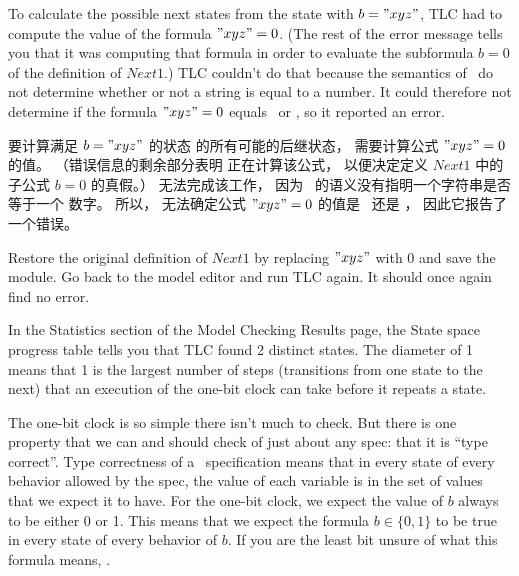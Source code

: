 \begin{en}
To calculate the possible next states from the state with $b="xyz"$,
TLC had to compute the value of the formula $"xyz"=0$.  (The rest of
the error message tells you that it was computing that formula in
order to evaluate the subformula $b=0$ of the definition of $Next1$.)
TLC couldn't do that because the semantics of \tlaplus\ do not
determine whether or not a string is equal to a 
number.  It could
therefore not determine if the formula $"xyz"=0$ equals \TRUE\ or
\FALSE, so it reported an error. 
\end{en}

\begin{ch}
  要计算满足 $b="xyz"$ 的状态  的所有可能的后继状态，
  \tlc{} 需要计算公式 $"xyz"=0$ 的值。
  （错误信息的剩余部分表明 \tlc{} 正在计算该公式，
  以便决定定义 $Next1$ 中的子公式 $b=0$ 的真假。）
  \tlc{} 无法完成该工作，
  因为 \tlaplus\ 的语义没有指明一个字符串是否等于一个
  数字。
  所以，\tlc{} 无法确定公式 $"xyz"=0$ 的值是 \TRUE\ 还是 \FALSE，
  因此它报告了一个错误。
\end{ch}

Restore the original definition of $Next1$ by replacing $"xyz"$ with 0
and save the module.  Go back to the model editor and run TLC again.
It should once again find no error.

\begin{ch}
\end{ch}

\pause
%
\noindent 
%
In the \textsf{Statistics} section of the \textsf{Model Checking
Results} page, the \textsf{State space progress} table tells you that
TLC found 2 distinct states.  The diameter of 1 means that 1 is the
largest number of steps (transitions from one state to the next) that
an execution of the one-bit clock can take before it repeats a state.

The one-bit clock is so simple there isn't much to check.  But there
is one property that we can and should check of just about any spec:
that it is 
``type correct''.  Type correctness of a \tlaplus\ specification
means that in every state of every behavior allowed by the spec, the
value of each variable is in the set of values that we expect it to
have.  For the one-bit clock, we expect the value of $b$ always to be
either 0 or 1.  This means that we expect the formula $b\in\{0,1\}$ to
be true in every state of every behavior of $b$.  If you are the least
bit unsure of what this formula means,
\textsf{}.

